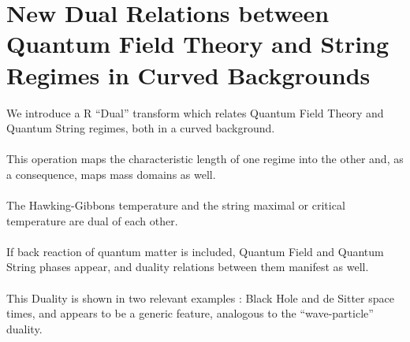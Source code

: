 \documentclass[12pt,a4paper]{article}
\begin{document}
 \section{New Dual Relations between Quantum Field Theory and String Regimes 
in Curved Backgrounds}
We introduce a R ``Dual'' transform which relates Quantum Field Theory and 
Quantum String regimes, both in a curved background.\\ \\
This operation maps the characteristic length of one regime into the other 
and, as a consequence, maps mass domains as well.\\ \\
The Hawking-Gibbons temperature and the string maximal or critical temperature 
are dual of each other.\\ \\
If back reaction of quantum matter is included, Quantum Field and Quantum 
String phases appear, and duality relations between them manifest as well.\\ \\
This Duality is shown in two relevant examples : Black Hole and de Sitter space times, and appears to be a generic feature, analogous to the ``wave-particle'' duality.\\
\end{document}
